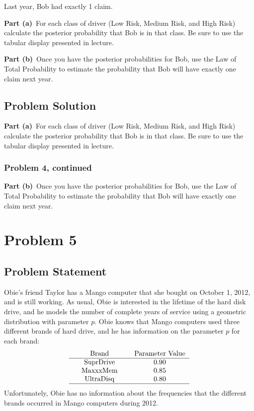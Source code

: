 \documentclass[12pt]{article}
\theoremstyle{definition}
\begin{document}
\bigskip
Last year, Bob had exactly 1 claim.

\bigskip
\noindent
{\bf Part (a)}\ For each class of driver (Low Risk, Medium Risk, and High Risk) calculate the posterior probability that Bob is in that class. Be sure to use the tabular display presented in lecture.

\bigskip
\noindent
{\bf Part (b)}\ Once you have the posterior probabilities for Bob, use the Law of Total Probability to estimate the probability that Bob will have exactly one claim next year.

\newpage
\subsection*{Problem Solution}

\noindent
{\bf Part (a)}\ For each class of driver (Low Risk, Medium Risk, and High Risk) calculate the posterior probability that Bob is in that class. Be sure to use the tabular display presented in lecture.

\newpage
\subsubsection*{Problem 4, continued}
\noindent
{\bf Part (b)}\ Once you have the posterior probabilities for Bob, use the Law of Total Probability to estimate the probability that Bob will have exactly one claim next year.

\newpage
\section*{Problem 5}



\subsection*{Problem Statement}

Obie's friend Taylor has a Mango computer that she bought on October 1, 2012, and is still working. As usual, Obie is interested in the lifetime of the hard disk drive, and he models the number of complete years of service using a geometric distribution with parameter $p$. Obie knows that Mango computers used three different brands of hard drive, and he has information on the parameter $p$ for each brand:
$$
\begin{tabular}{ccccc}
& Brand & & Parameter Value\\
\hline
& SuprDrive & & 0.90\\
& MaxxxMem & & 0.85\\
& UltraDisq & & 0.80\\
\hline 
\end{tabular}
$$
Unfortunately, Obie has no information about the frequencies that the different brands occurred in Mango computers during 2012.
\end{document}
